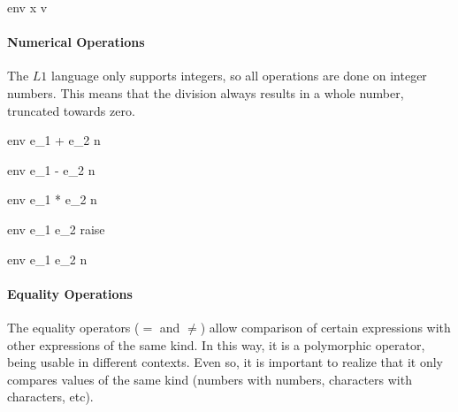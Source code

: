\documentclass{article}
\begin{document}
	
	

	{\mbox{env} \vdash x \Downarrow v}
	
\paragraph{Numerical Operations}
The $L1$ language only supports integers, so all operations are done on integer numbers.
This means that the division always results in a whole number, truncated towards zero.

\medskip

	{\mbox{env} \vdash e_1 + e_2 \Downarrow n}
	
	{\mbox{env} \vdash e_1 - e_2 \Downarrow n}
	
	{\mbox{env} \vdash e_1 * e_2 \Downarrow n}
	
	{\mbox{env} \vdash e_1 \div e_2 \Downarrow raise}
	
	{\mbox{env} \vdash e_1 \div e_2 \Downarrow n}
	
\paragraph{Equality Operations}
The equality operators ($=$ and $\neq$) allow comparison of certain expressions with other expressions of the same kind.
In this way, it is a polymorphic operator, being usable in different contexts.
Even so, it is important to realize that it only compares values of the same kind (numbers with numbers, characters with characters, etc).
\end{document}
